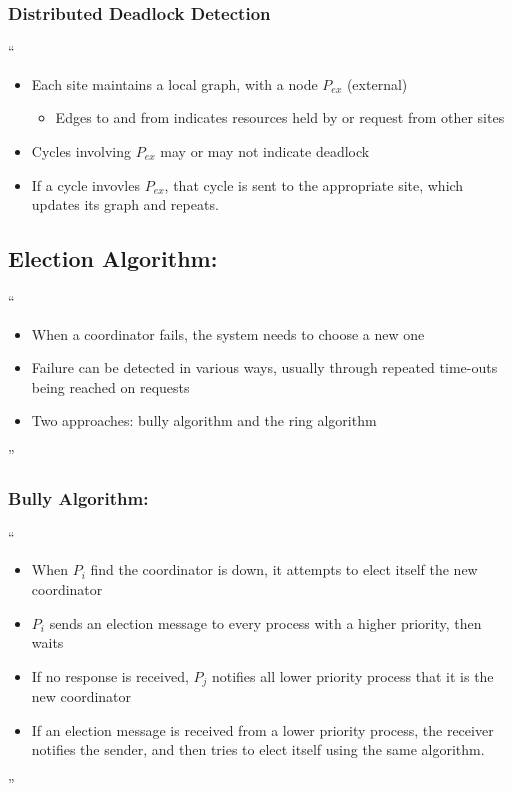 \documentclass[11pt]{article}
\begin{document}
\subsubsection{Distributed Deadlock Detection}
``\begin{itemize}
\item Each site maintains a local graph, with a node $P_{ex}$ (external)
\begin{itemize}
\item Edges to and from indicates resources held by or request from other sites
\end{itemize}
\item Cycles involving $P_{ex}$ may or may not indicate deadlock
\item If a cycle invovles $P_{ex}$, that cycle is sent to the appropriate site, which updates its graph and repeats.
\end {itemize}
	
\subsection{Election Algorithm:}
``\begin{itemize}
\item When a coordinator fails, the system needs to choose a new one
\item Failure can be detected in various ways, usually through repeated time-outs being reached on requests
\item Two approaches: bully algorithm and the ring algorithm 
\end{itemize}''

\subsubsection {Bully Algorithm:}
``\begin{itemize}
\item When $P_i$ find the coordinator is down, it attempts to elect itself the new coordinator
\item $P_i$ sends an election message to every process with a higher priority, then waits
\item If no response is received, $P_j$ notifies all lower priority process that it is the new coordinator
\item If an election message is received from a lower priority process, the receiver notifies the sender, and then tries to elect itself using the same algorithm.
\end{itemize}''
\end{document}
